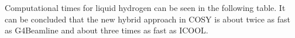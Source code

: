 \documentclass[portrait,a0paper,fontscale=0.285]{baposter} %
\begin{document}
\begin{poster}
{Computational times for liquid hydrogen can be seen in the following table. It can be concluded that the new hybrid approach in COSY is about twice as fast as G4Beamline and about three times as fast as ICOOL.

}

\end{poster}
\end{document}
